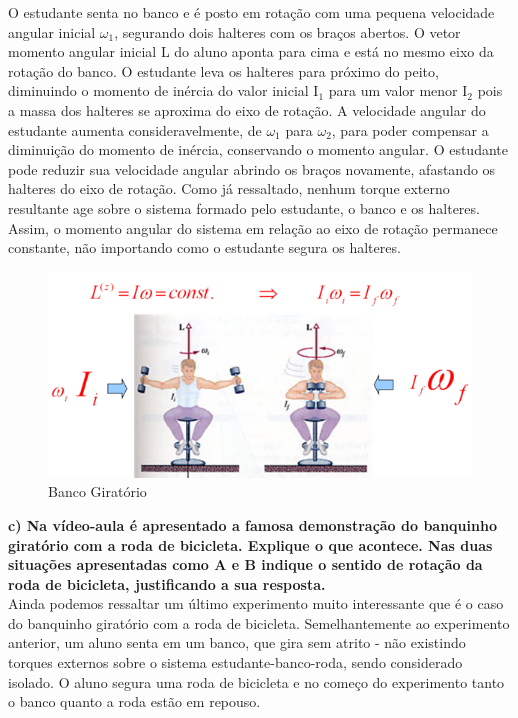 O estudante senta no banco e é posto em rotação com uma pequena velocidade angular inicial $\omega _1$, segurando dois halteres com os braços abertos. O vetor momento angular inicial L do aluno aponta para cima e está no mesmo eixo da rotação do banco. O estudante leva os halteres para próximo do peito, diminuindo o momento de inércia do valor inicial I$_1$ para um valor menor I$_2$ pois a massa dos halteres se aproxima do eixo de rotação. A velocidade angular do estudante aumenta consideravelmente, de $\omega _1$ para $\omega _2$, para poder compensar a diminuição do momento de inércia, conservando o momento angular. O estudante pode reduzir sua velocidade angular abrindo os braços novamente, afastando os halteres do eixo de rotação. Como já ressaltado, nenhum torque externo resultante age sobre o sistema formado pelo estudante, o banco e os halteres. Assim, o momento angular do sistema em relação ao eixo de rotação permanece constante, não importando como o estudante segura os halteres.

\begin{figure}[H]
  \centering
  \includegraphics[scale=1.3]{images/i4.png}
  \caption{Banco Giratório}
\end{figure}

\textbf{c) Na vídeo-aula é apresentado a famosa demonstração do banquinho giratório com a roda de bicicleta. Explique o que acontece. Nas duas situações apresentadas como A e B indique o sentido de rotação da roda de bicicleta, justificando a sua resposta.}\\

Ainda podemos ressaltar um último experimento muito interessante que é o caso do banquinho giratório com a roda de bicicleta. Semelhantemente ao experimento anterior, um aluno senta em um banco, que gira sem atrito - não existindo torques externos sobre o sistema estudante-banco-roda, sendo considerado isolado. O aluno segura uma roda de bicicleta e no começo do experimento tanto o banco quanto a roda estão em repouso.\\

